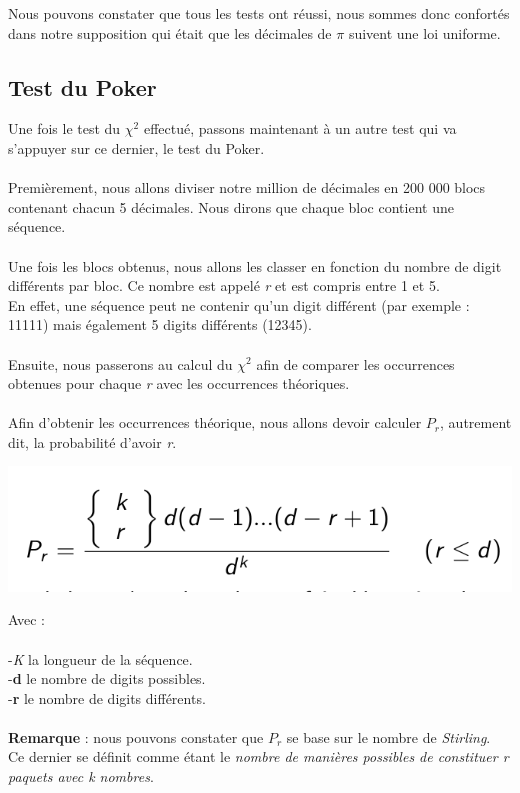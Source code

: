 \documentclass[french]{article}
\begin{document}
Nous pouvons constater que tous les tests ont réussi, nous sommes donc confortés dans notre supposition qui était que les décimales de $\pi$ suivent une loi uniforme.
\\

\subsection{Test du Poker}
Une fois le test du $\chi^{2}$ effectué, passons maintenant à un autre test qui va s'appuyer sur ce dernier, le test du Poker. 
\\
\\
Premièrement, nous allons diviser notre million de décimales en 200 000 blocs contenant chacun 5 décimales. Nous dirons que chaque bloc contient une séquence.
\\
\\
Une fois les blocs obtenus, nous allons les classer en fonction du nombre de digit différents par bloc. Ce nombre est appelé \textit{r} et est compris entre 1 et 5.
\\
En effet, une séquence peut ne contenir qu'un digit différent (par exemple : 11111) mais également 5 digits différents (12345).
\\
\\
Ensuite, nous passerons au calcul du $\chi^{2}$ afin de comparer les occurrences obtenues pour chaque \textit{r} avec les occurrences théoriques.
\\
\\
Afin d'obtenir les occurrences théorique, nous allons devoir calculer $P_{r}$, autrement dit, la probabilité d'avoir \textit{r}.
	\begin{center}
		\includegraphics[scale=0.40]{Archives/Images/probaR}
	\end{center}

Avec :
\\
\\
	-\textit{K} la longueur de la séquence.
	\\
	-\textbf{d} le nombre de digits possibles.
	 \\
	-\textbf{r} le nombre de digits différents.
\\
\\
\textbf{Remarque} : nous pouvons constater que $P_{r}$ se base sur le nombre de \textit{Stirling}.
\\
Ce dernier se définit comme étant le \textit{nombre de manières possibles de constituer r paquets avec k nombres}.
\end{document}
